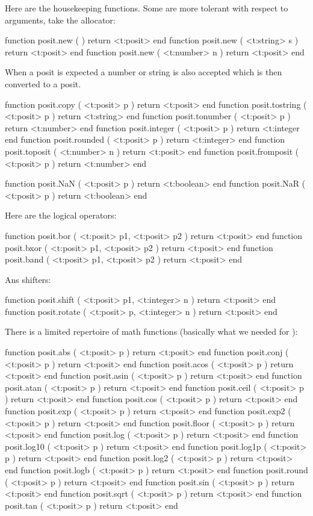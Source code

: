 Here are the housekeeping functions. Some are more tolerant with respect to
arguments, take the allocator:

\starttyping[option=LUA]
function posit.new (              ) return <t:posit> end
function posit.new ( <t:string> s ) return <t:posit> end
function posit.new ( <t:number> n ) return <t:posit> end
\stoptyping

When a posit is expected a number or string is also accepted which is then
converted to a posit.

\starttyping[option=LUA]
function posit.copy      ( <t:posit>  p ) return <t:posit>   end
function posit.tostring  ( <t:posit>  p ) return <t:string>  end
function posit.tonumber  ( <t:posit>  p ) return <t:number>  end
function posit.integer   ( <t:posit>  p ) return <t:integer  end
function posit.rounded   ( <t:posit>  p ) return <t:integer> end
function posit.toposit   ( <t:number> n ) return <t:posit>   end
function posit.fromposit ( <t:posit>  p ) return <t:number>  end
\stoptyping

\starttyping[option=LUA]
function posit.NaN ( <t:posit> p ) return <t:boolean> end
function posit.NaR ( <t:posit> p ) return <t:boolean> end
\stoptyping

Here are the logical operators:

\starttyping[option=LUA]
function posit.bor  ( <t:posit> p1, <t:posit> p2 ) return <t:posit> end
function posit.bxor ( <t:posit> p1, <t:posit> p2 ) return <t:posit> end
function posit.band ( <t:posit> p1, <t:posit> p2 ) return <t:posit> end
\stoptyping

Ans shifters:

\starttyping[option=LUA]
function posit.shift  ( <t:posit> p1, <t:integer> n ) return <t:posit> end
function posit.rotate ( <t:posit> p,  <t:integer> n ) return <t:posit> end
\stoptyping

There is a limited repertoire of math functions (basically what we needed for
\METAPOST):

\starttyping[option=LUA]
function posit.abs   ( <t:posit> p ) return <t:posit> end
function posit.conj  ( <t:posit> p ) return <t:posit> end
function posit.acos  ( <t:posit> p ) return <t:posit> end
function posit.asin  ( <t:posit> p ) return <t:posit> end
function posit.atan  ( <t:posit> p ) return <t:posit> end
function posit.ceil  ( <t:posit> p ) return <t:posit> end
function posit.cos   ( <t:posit> p ) return <t:posit> end
function posit.exp   ( <t:posit> p ) return <t:posit> end
function posit.exp2  ( <t:posit> p ) return <t:posit> end
function posit.floor ( <t:posit> p ) return <t:posit> end
function posit.log   ( <t:posit> p ) return <t:posit> end
function posit.log10 ( <t:posit> p ) return <t:posit> end
function posit.log1p ( <t:posit> p ) return <t:posit> end
function posit.log2  ( <t:posit> p ) return <t:posit> end
function posit.logb  ( <t:posit> p ) return <t:posit> end
function posit.round ( <t:posit> p ) return <t:posit> end
function posit.sin   ( <t:posit> p ) return <t:posit> end
function posit.sqrt  ( <t:posit> p ) return <t:posit> end
function posit.tan   ( <t:posit> p ) return <t:posit> end

